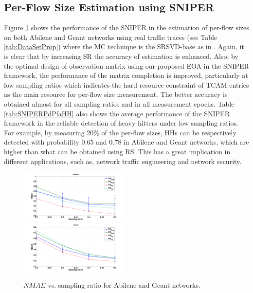 \subsection{Per-Flow Size Estimation using SNIPER}
Figure \ref{fig:AbileneGeantGATMC} shows the performance of the SNIPER in the estimation of per-flow sizes on both Abilene and Geant networks using real traffic traces (see Table \ref{tab:DataSetProp}) where the MC technique is the SRSVD-base as in \cite{Roughan:2012}. Again, it is clear that by increasing SR the accuracy of estimation is enhanced. Also, by the optimal design of observation matrix using our proposed EOA in the SNIPER framework, the performance of the matrix completion is improved, particularly at low sampling ratios which indicates the hard resource constraint of TCAM entries as the main resource for per-flow size measurement. The better accuracy is obtained almost for all sampling ratios and in all measurement epochs. Table \ref{tab:SNIPERPdPfaHH} also shows the average performance of the SNIPER framework in the reliable detection of heavy hitters under low sampling ratios. For example, by measuring 20\% of the per-flow sizes, HHs can be respectively detected with probability 0.65 and 0.78 in Abilene and Geant networks, which are higher than what can be obtained using RS. This has a great implication in different applications, such as, network traffic engineering and network security.

\begin{figure}
  \begin{center}
    {\includegraphics[keepaspectratio, width=0.49\textwidth]{AbileneGATMC.png}} \\
    {\includegraphics[keepaspectratio, width=0.49\textwidth]{GeantGATMC.png}}
  \caption{{{$NMAE$ vs. sampling ratio for Abilene and Geant networks.}}}
  \label{fig:AbileneGeantGATMC}
  \end{center}
\end{figure}

